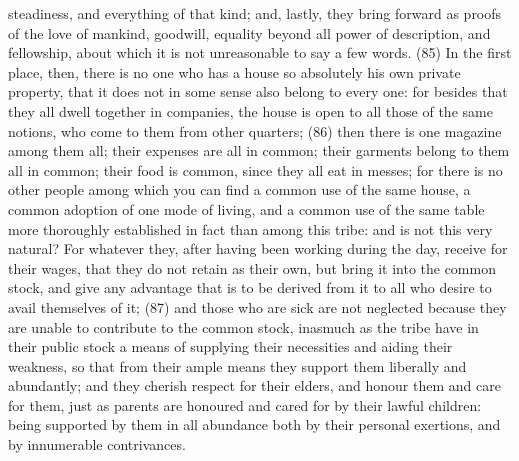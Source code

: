 steadiness, and everything of that kind; and, lastly, they bring forward as proofs of the love of
mankind, goodwill, equality beyond all power of description, and fellowship, about which it is not
unreasonable to say a few words. (85) In the first place, then, there is no one who has a house so
absolutely his own private property, that it does not in some sense also belong to every one: for
besides that they all dwell together in companies, the house is open to all those of the same
notions, who come to them from other quarters; (86) then there is one magazine among them all;
their expenses are all in common; their garments belong to them all in common; their food is
common, since they all eat in messes; for there is no other people among which you can find a
common use of the same house, a common adoption of one mode of living, and a common use of
the same table more thoroughly established in fact than among this tribe: and is not this very
natural? For whatever they, after having been working during the day, receive for their wages, that
they do not retain as their own, but bring it into the common stock, and give any advantage that is
to be derived from it to all who desire to avail themselves of it; (87) and those who are sick are not
neglected because they are unable to contribute to the common stock, inasmuch as the tribe have
in their public stock a means of supplying their necessities and aiding their weakness, so that from
their ample means they support them liberally and abundantly; and they cherish respect for their
elders, and honour them and care for them, just as parents are honoured and cared for by their
lawful children: being supported by them in all abundance both by their personal exertions, and by
innumerable contrivances.

